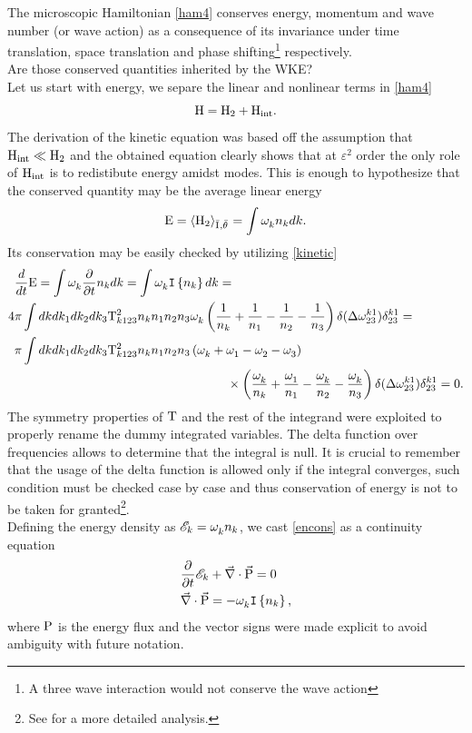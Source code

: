 The microscopic Hamiltonian \eqref{ham4} conserves energy, momentum and wave number (or wave action) as a consequence of its invariance under time translation,
space translation and phase shifting\footnote{A three wave interaction would not conserve the wave action} respectively. \\
Are those conserved quantities inherited by the WKE?\\
Let us start with energy, we separe the linear and nonlinear terms in \eqref{ham4}
\begin{equation}
    \mathrm{H} = \mathrm{H}_2 + \mathrm{H}_{\text{int}}.
\end{equation}
The derivation of the kinetic equation was based off the assumption that $\mathrm{H}_{\text{int}} \ll \mathrm{H}_{2}$ and the obtained equation clearly shows that at $\varepsilon^2$ 
order the only role of $\mathrm{H}_{\text{int}}$ is to redistibute energy amidst modes. This is enough to hypothesize that the conserved quantity may be the average linear energy
\begin{equation}
    \mathrm{E} = \left\langle \mathrm{H}_2 \right\rangle_{\bar{\mathrm{I}^{}},\bar{\theta}^{}} = \int \omega^{}_k n_k dk.
\end{equation}
Its conservation may be easily checked by utilizing \eqref{kinetic} 
\begin{align}
    &\dt \Ewav = \int \omga_k \pt n_k dk = \int \omga_k \coll dk = \label{encons}\\
    4 &\pi\int  dk dk_1 dk_2 dk_3 
    \Tint^2_{k123}n_kn_1n_2n_3 \omga_k
    \left(\frac{1}{n_k} + \frac{1}{n_1} - \frac{1}{n_2}- \frac{1}{n_3}  \right)
    \delta(\delomega^{k1}_{23})\delta^{k1}_{23} = \\
    &\pi\int  dk dk_1 dk_2 dk_3 
    \Tint^2_{k123}n_kn_1n_2n_3\left(\omga_k + \omga_1 - \omga_2 - \omga_3\right) \\
    & \hspace{6cm}\times\left(\frac{\omga_k}{n_k} + \frac{\omga_1}{n_1} - \frac{\omga_k}{n_2}- \frac{\omga_k}{n_3}  \right)
    \delta(\delomega^{k1}_{23})\delta^{k1}_{23} = 0.    
\end{align}
The symmetry properties of $\mathrm{T}$ and the rest of the integrand were exploited to properly rename the dummy integrated variables. The delta function over frequencies 
allows to determine that the integral is null. It is crucial to remember that the usage of the delta function is allowed only if the integral converges, such condition
must be checked case by case and thus conservation of energy is not to be taken for granted\footnote{See \cite{Zakharov} for a more detailed analysis.}. \\
Defining the energy density as $\mathscr{E}_k = \omega^{}_k n_k$, we cast \eqref{encons} as a continuity equation
\begin{align}
    &\frac{\partial}{\partial t} \mathscr{E}_k + \vec{\nabla}\cdot\vec{\mathrm{P}} = 0 \label{Econtinuity}\\
    &\vec{\nabla}\cdot\vec{\mathrm{P}} = -\omega^{}_k \mathtt{I}\left\{n_k\right\}, 
\end{align}
where $\mathrm{P}$ is the energy flux and the vector signs were made explicit to avoid ambiguity with future notation. \\

